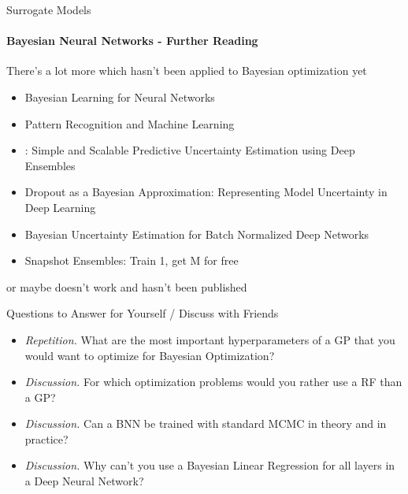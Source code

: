 \begin{frame}[c]{Surrogate Models}
\framesubtitle{Bayesian Neural Networks - Further Reading}

There's a lot more which hasn't been applied to Bayesian optimization yet
\begin{itemize}
        \item {} Bayesian Learning for Neural Networks
        \item {} Pattern Recognition and Machine Learning
        \item {}: Simple and Scalable Predictive Uncertainty Estimation using Deep Ensembles
        \item {} Dropout as a Bayesian Approximation:
        Representing Model Uncertainty in Deep Learning
        \item {} Bayesian Uncertainty Estimation for Batch Normalized Deep Networks
        \item {} Snapshot Ensembles: Train 1, get M for free
\end{itemize}
or maybe doesn't work and hasn't been published
\end{frame}
\begin{frame}[c]{Questions to Answer for Yourself / Discuss with Friends}

\begin{itemize}
    \item \emph{Repetition.} What are the most important hyperparameters of a GP that you would want to optimize for Bayesian Optimization? 
    \item \emph{Discussion.} For which optimization problems would you rather use a RF than a GP?
    \item \emph{Discussion.} Can a BNN be trained with standard MCMC in theory and in practice?
    \item \emph{Discussion.} Why can't you use a Bayesian Linear Regression for all layers in a Deep Neural Network?
\end{itemize}
\end{frame}
